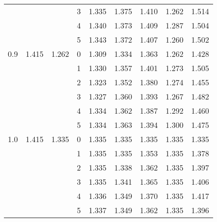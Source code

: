 \begin{tabular}{llllrrrrr}
    &       &       & 3 &  1.335 &  1.375 &  1.410 &  1.262 &  1.514 \\
    &       &       & 4 &  1.340 &  1.373 &  1.409 &  1.287 &  1.504 \\
    &       &       & 5 &  1.343 &  1.372 &  1.407 &  1.260 &  1.502 \\
0.9 & 1.415 & 1.262 & 0 &  1.309 &  1.334 &  1.363 &  1.262 &  1.428 \\
    &       &       & 1 &  1.330 &  1.357 &  1.401 &  1.273 &  1.505 \\
    &       &       & 2 &  1.323 &  1.352 &  1.380 &  1.274 &  1.455 \\
    &       &       & 3 &  1.327 &  1.360 &  1.393 &  1.267 &  1.482 \\
    &       &       & 4 &  1.334 &  1.362 &  1.387 &  1.292 &  1.460 \\
    &       &       & 5 &  1.334 &  1.363 &  1.394 &  1.300 &  1.475 \\
1.0 & 1.415 & 1.335 & 0 &  1.335 &  1.335 &  1.335 &  1.335 &  1.335 \\
    &       &       & 1 &  1.335 &  1.335 &  1.353 &  1.335 &  1.378 \\
    &       &       & 2 &  1.335 &  1.338 &  1.362 &  1.335 &  1.397 \\
    &       &       & 3 &  1.335 &  1.341 &  1.365 &  1.335 &  1.406 \\
    &       &       & 4 &  1.336 &  1.349 &  1.370 &  1.335 &  1.417 \\
    &       &       & 5 &  1.337 &  1.349 &  1.362 &  1.335 &  1.396 \\
\bottomrule
\end{tabular}
